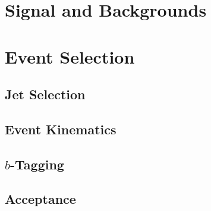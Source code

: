 \section{Signal and Backgrounds}
\label{sec:evt-s+b}

\section{Event Selection}
\label{sec:evt-sel}

\subsection{Jet Selection}
\label{sec:evt-sel-jet}

\subsection{Event Kinematics}
\label{sec:evt-sel-event}

\subsection{$b$-Tagging}
\label{sec:evt-sel-btag}

\subsection{Acceptance}
\label{sec:evt-sel-acc}
